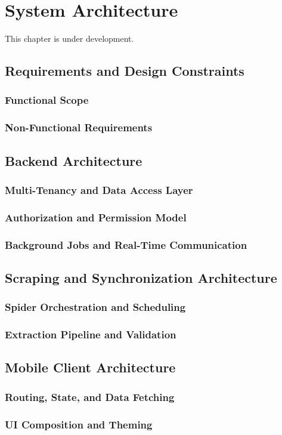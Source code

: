 \chapter{System Architecture}
\label{chap:system_architecture}

This chapter is under development.

\section{Requirements and Design Constraints}
\subsection{Functional Scope}
\subsection{Non-Functional Requirements}

\section{Backend Architecture}
\subsection{Multi-Tenancy and Data Access Layer}
\subsection{Authorization and Permission Model}
\subsection{Background Jobs and Real-Time Communication}

\section{Scraping and Synchronization Architecture}
\subsection{Spider Orchestration and Scheduling}
\subsection{Extraction Pipeline and Validation}

\section{Mobile Client Architecture}
\subsection{Routing, State, and Data Fetching}
\subsection{UI Composition and Theming}
